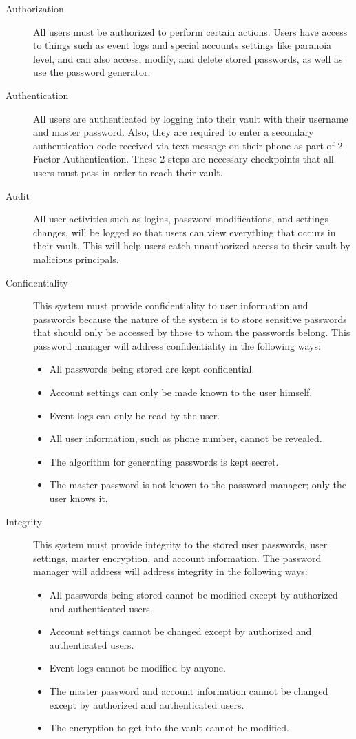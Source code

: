 \documentclass{article}
\begin{document}
\begin{description}
  \item[Authorization] All users must be authorized to perform certain actions. Users have access to things such as event logs and special accounts settings like paranoia level, and can also access, modify, and delete stored passwords, as well as use the password generator.
  \item[Authentication] All users are authenticated by logging into their vault with their username and master password. Also, they are required to enter a secondary authentication code received via text message on their phone as part of 2-Factor Authentication. These 2 steps are necessary checkpoints that all users must pass in order to reach their vault.
  \item[Audit] All user activities such as logins, password modifications, and settings changes, will be logged so that users can view everything that occurs in their vault. This will help users catch unauthorized access to their vault by malicious principals.
  \item[Confidentiality] This system must provide confidentiality to user information and passwords because the nature of the system is to store sensitive passwords that should only be accessed by those to whom the passwords belong. This password manager will address confidentiality in the following ways: \begin{itemize}
    \item All passwords being stored are kept confidential.
    \item Account settings can only be made known to the user himself.
    \item Event logs can only be read by the user.
    \item All user information, such as phone number, cannot be revealed.
    \item The algorithm for generating passwords is kept secret.
    \item The master password is not known to the password manager; only the user knows it.
  \end{itemize}
  \item[Integrity] This system must provide integrity to the stored user passwords, user settings, master encryption, and account information. The password manager will address will address integrity in the following ways:
    \begin{itemize}
      \item All passwords being stored cannot be modified except by authorized and authenticated users.
      \item Account settings cannot be changed except by authorized and authenticated users.
      \item Event logs cannot be modified by anyone.
      \item The master password and account information cannot be changed except by authorized and authenticated users.
      \item The encryption to get into the vault cannot be modified.
    \end{itemize}
\end{description}
\end{document}
